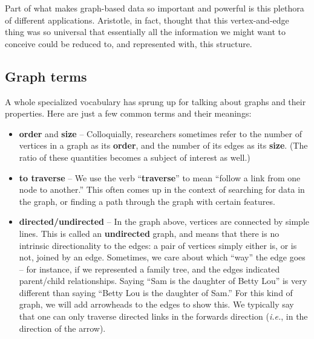 
Part of what makes graph-based data so important and powerful is this plethora
of different applications. Aristotle, in fact, thought that this
vertex-and-edge thing was so universal that essentially all the information we
might want to conceive could be reduced to, and represented with, this
structure.

\subsection{Graph terms}

A whole specialized vocabulary has sprung up for talking about graphs and
their properties. Here are just a few common terms and their meanings:

\begin{itemize}
\itemsep.1em


\item \textbf{order} and \textbf{size} -- Colloquially, researchers sometimes
refer to the number of vertices in a graph as its \textbf{order}, and the
number of its edges as its \textbf{size}. (The ratio of these quantities
becomes a subject of interest as well.)


\item \textbf{to traverse} -- We use the verb ``\textbf{traverse}'' to mean
``follow a link from one node to another.'' This often comes up in the context
of searching for data in the graph, or finding a path through the graph with
certain features.


\item \textbf{directed/undirected} -- In the graph above, vertices are
connected by simple lines. This is called an \textbf{undirected} graph, and
means that there is no intrinsic directionality to the edges: a pair of
vertices simply either is, or is not, joined by an edge. Sometimes, we care
about which ``way'' the edge goes -- for instance, if we represented a family
tree, and the edges indicated parent/child relationships. Saying ``Sam is the
daughter of Betty Lou'' is very different than saying ``Betty Lou is the
daughter of Sam.'' For this kind of graph, we will add arrowheads to the edges
to show this. We typically say that one can only traverse directed links in
the forwards direction (\textit{i.e.}, in the direction of the arrow).


\end{itemize}
